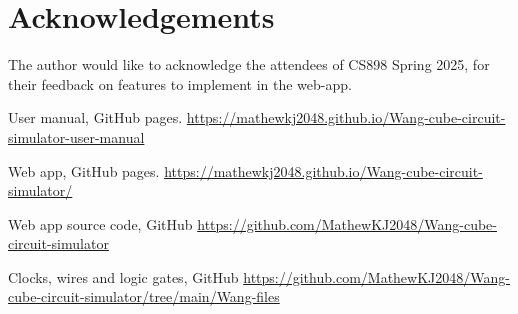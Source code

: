 \documentclass[letterpaper,11pt]{article}
\begin{document}
\section*{Acknowledgements}

The author would like to acknowledge the attendees of CS898 Spring 2025, for their feedback on features to implement in the web-app.

    
{\setlength{\baselineskip}{13pt} %
\raggedright				%
\begin{thebibliography}{99}








 User manual, GitHub pages. \url{https://mathewkj2048.github.io/Wang-cube-circuit-simulator-user-manual}

 Web app, GitHub pages. \url{https://mathewkj2048.github.io/Wang-cube-circuit-simulator/}

 Web app source code, GitHub \url{https://github.com/MathewKJ2048/Wang-cube-circuit-simulator}

 Clocks, wires and logic gates, GitHub \url{https://github.com/MathewKJ2048/Wang-cube-circuit-simulator/tree/main/Wang-files}


\end{thebibliography}}
\end{document}
